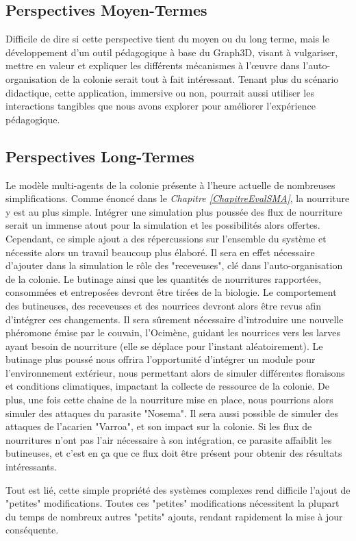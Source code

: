 	\subsection*{Perspectives Moyen-Termes}	
	Difficile de dire si cette perspective tient du moyen ou du long terme, mais le développement d'un outil pédagogique à base du Graph3D, visant à vulgariser, mettre en valeur et expliquer les différents mécanismes à l'œuvre dans l'auto-organisation de la colonie serait tout à fait intéressant. Tenant plus du scénario didactique, cette application, immersive ou non, pourrait aussi utiliser les interactions tangibles que nous avons explorer pour améliorer l'expérience pédagogique.
	
	\subsection*{Perspectives Long-Termes}
	Le modèle multi-agents de la colonie présente à l'heure actuelle de nombreuses simplifications. Comme énoncé dans le \textit{Chapitre \ref{ChapitreEvalSMA}}, la nourriture y est au plus simple. Intégrer une simulation plus poussée des flux de nourriture serait un immense atout pour la simulation et les possibilités alors offertes. Cependant, ce simple ajout a des répercussions sur l'ensemble du système et nécessite alors un travail beaucoup plus élaboré. Il sera en effet nécessaire d'ajouter dans la simulation le rôle des "receveuses", clé dans l'auto-organisation de la colonie. Le butinage ainsi que les quantités de nourritures rapportées, consommées et entreposées devront être tirées de la biologie. Le comportement des butineuses, des receveuses et des nourrices devront alors être revus afin d'intégrer ces changements. Il sera sûrement nécessaire d'introduire une nouvelle phéromone émise par le couvain, l'Ocimène, guidant les nourrices vers les larves ayant besoin de nourriture (elle se déplace pour l'instant aléatoirement). Le butinage plus poussé nous offrira l'opportunité d'intégrer un module pour l'environnement extérieur, nous permettant alors de simuler différentes floraisons et conditions climatiques, impactant la collecte de ressource de la colonie. De plus, une fois cette chaine de la nourriture mise en place, nous pourrions alors simuler des attaques du parasite "Nosema". Il sera aussi possible de simuler des attaques de l'acarien "Varroa", et son impact sur la colonie. Si les flux de nourritures n'ont pas l'air nécessaire à son intégration, ce parasite affaiblit les butineuses, et c'est en ça que ce flux doit être présent pour obtenir des résultats intéressants.
	
	Tout est lié, cette simple propriété des systèmes complexes rend difficile l'ajout de "petites" modifications. Toutes ces "petites" modifications nécessitent la plupart du temps de nombreux autres "petits" ajouts, rendant rapidement la mise à jour conséquente.
	